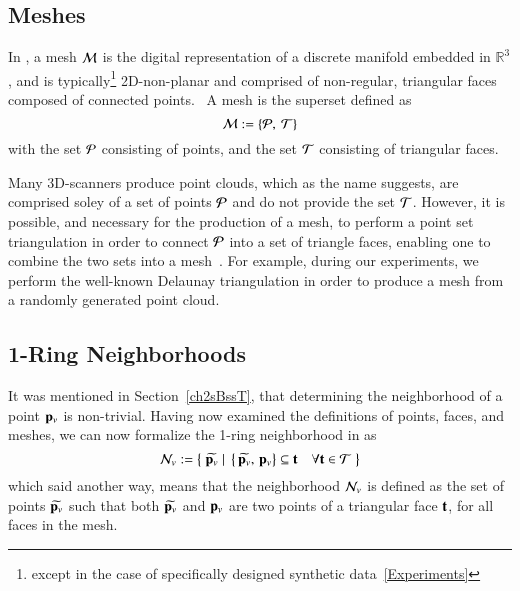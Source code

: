 \subsection{Meshes}
\label{ch2s3ssM}
In \tdd{}, a mesh $\mathcal{M}$ is the digital representation of a discrete manifold embedded in $\mathbb{R}^3$, and is typically\footnote{except in the case of specifically designed synthetic data~\ref{Experiments}} 2D-non-planar and comprised of non-regular, triangular faces composed of connected points.~\cite[p.~25]{Mara12} A mesh is the superset defined as
\begin{equation}
	\mathcal{M} := \left \{\mathcal{P},\:\mathcal{T}\right \}
	\label{eq:defineMesh}
\end{equation}%
%
with the set $\mathcal{P}$ consisting of points, and the set $\mathcal{T}$ consisting of triangular faces.

Many 3D-scanners produce point clouds\todoCitation{}{}, which as the name suggests, are comprised soley of a set of points $\mathcal{P}$ and do not provide the set $\mathcal{T}$. However, it is possible, and necessary for the production of a mesh, to perform a point set triangulation\todoCitation{}{} in order to connect $\mathcal{P}$ into a set of triangle faces, enabling one to combine the two sets into a mesh~\cite[p.~26]{Mara12}. For example, during our experiments, we perform the well-known Delaunay triangulation\todoCitation{} in order to produce a mesh from a randomly generated point cloud.
%
\subsection{1-Ring Neighborhoods}
\label{ch2s3ssNRN}
It was mentioned in Section~\ref{ch2sBssT}, that determining the neighborhood of a point $\mathbf{p}_v$ is non-trivial. Having now examined the definitions of points, faces, and meshes, we can now formalize the 1-ring neighborhood in \tdd{} as
\begin{equation}
	\mathcal{N}_v := \left \{\;\widetilde{\mathbf{p}_v}\;|\;\left \{\,\widetilde{\mathbf{p}_v},\,\mathbf{p}_v\right \} \subseteq \mathbf{t} \quad \forall \mathbf{t} \in \mathcal{T}\;\right \}
	\label{eq:defineNeighborhood}
\end{equation}%
%
%
%
which said another way, means that the neighborhood $\mathcal{N}_v$ is defined as the set of points $\widetilde{\mathbf{p}_v}$ such that both $\widetilde{\mathbf{p}_v}$ and $\mathbf{p}_v$ are two points of a triangular face $\mathbf{t}$, for all faces in the mesh.

